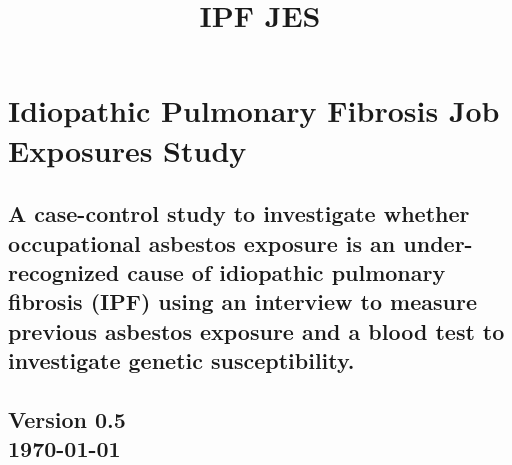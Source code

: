 \documentclass[a4paper,10pt]{article}
\title{\bf IPF JES}
\date{}
\begin{document}
\pagestyle{fancy} 


\maketitle



\section*{Idiopathic Pulmonary Fibrosis Job Exposures Study}
 \subsection*{A case-control study to investigate whether occupational asbestos exposure is an under-recognized cause of idiopathic pulmonary fibrosis (IPF) using an interview to measure previous
asbestos exposure and a blood test to investigate genetic susceptibility.}


\begin{centering}
\subsection*{Version 0.5 \\ \today}
\end{centering}
\end{document}
